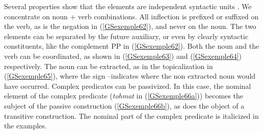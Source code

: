\documentclass[output=paper]{langsci/langscibook}
\begin{document}
{Several properties show that the elements are independent syntactic units \citep{Karimi-Doostan97a, megerdoomian2000beyond, pollet2012grammaire}. We concentrate on noun + verb combinations. All inflection is prefixed or suffixed on the verb, as is the negation in (\ref{GSexemple62}), and never on the noun. The two elements can be separated by the future auxiliary, or even by clearly syntactic constituents, like the complement PP in (\ref{GSexemple62}). Both the noun and the verb can be coordinated, as shown in (\ref{GSexemple63}) and (\ref{GSexemple64}) respectively. The noun can be extracted, as in the topicalization in (\ref{GSexemple65}), where the sign --indicates where the non extracted noun would have occurred. Complex predicates can be passivized. In this case, the nominal element of the complex predicate (\textit{tohmat} in (\ref{GSexemple66a})) becomes the subject of the passive construction (\ref{GSexemple66b}), as does the object of a transitive construction. The nominal part of the complex predicate is italicized in the examples.

\begin{exe}
	\label{GSexemple62}
\end{exe}

\begin{exe}
	\label{GSexemple63}
\end{exe}

\begin{exe}
	\label{GSexemple64}
\end{exe}

\begin{exe}
	\label{GSexemple65}
\end{exe}

}
\end{document}
